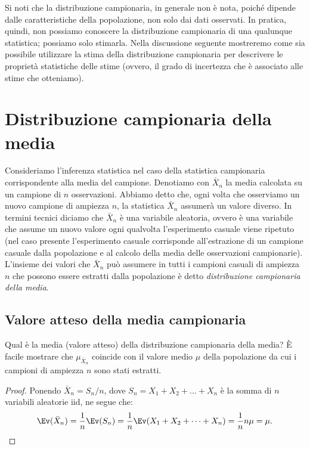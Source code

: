 Si noti che la distribuzione campionaria, in generale non è nota, poiché dipende dalle caratteristiche della popolazione, non solo dai dati osservati.
In pratica, quindi, non possiamo conoscere la distribuzione campionaria di una qualunque statistica; possiamo solo stimarla. 
Nella discussione seguente mostreremo come sia possibile utilizzare la stima della distribuzione campionaria per descrivere le proprietà statistiche delle stime (ovvero, il grado di incertezza che è associato alle stime che otteniamo).


\section{Distribuzione campionaria della media}

Consideriamo l'inferenza statistica nel caso della statistica campionaria corrispondente alla media del campione.
Denotiamo con $\bar{X}_n$ la media calcolata su un campione di $n$ osservazioni.
Abbiamo detto che, ogni volta che osserviamo un nuovo campione di ampiezza $n$, la statistica $\bar{X}_n$ assumerà un valore diverso.
In termini tecnici diciamo che $\bar{X}_n$ è una variabile aleatoria, ovvero è una variabile che assume un nuovo valore ogni qualvolta l'esperimento casuale viene ripetuto (nel caso presente l'esperimento casuale corrisponde all'estrazione di un campione casuale dalla popolazione e al calcolo della media delle osservazioni campionarie).
L'insieme dei valori che $\bar{X}_n$ può assumere in tutti i campioni casuali di ampiezza $n$ che possono essere estratti dalla popolazione è detto \emph{distribuzione campionaria della media}.


\subsection{Valore atteso della media campionaria}


Qual è la media (valore atteso) della distribuzione campionaria della media?
È facile mostrare che $\mu_{\bar{X}_n}$ coincide con il valore medio $\mu$ della popolazione da cui i campioni di ampiezza $n$ sono stati estratti. 
\begin{proof}
Ponendo $\bar{X}_n = S_n/n$, dove $S_n = X_1 + X_2 + \dots + X_n$ è la somma di $n$ variabili aleatorie iid, ne segue che: 
\begin{equation}
\Ev(\bar{X}_n) = \frac{1}{n}  \Ev(S_n) = \frac{1}{n} \Ev(X_1 + X_2 + \dots + X_n ) =  \frac{1}{n} n \mu = \mu.
\end{equation}
\end{proof}


